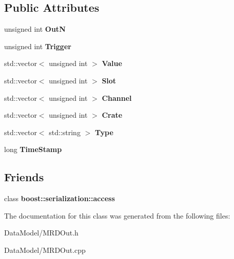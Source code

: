 \subsection*{Public Attributes}
\begin{DoxyCompactItemize}
\item 
\hypertarget{classMRDOut_a99fcd630b69a452e867b30bda86b9d6c}{unsigned int {\bfseries Out\-N}}\label{classMRDOut_a99fcd630b69a452e867b30bda86b9d6c}

\item 
\hypertarget{classMRDOut_aefae0cae9b9149247c66fec5140393af}{unsigned int {\bfseries Trigger}}\label{classMRDOut_aefae0cae9b9149247c66fec5140393af}

\item 
\hypertarget{classMRDOut_ae8b80ae7773fb9573a26cf791e18995d}{std\-::vector$<$ unsigned int $>$ {\bfseries Value}}\label{classMRDOut_ae8b80ae7773fb9573a26cf791e18995d}

\item 
\hypertarget{classMRDOut_a03e751accc75934f1ad7926415ce570e}{std\-::vector$<$ unsigned int $>$ {\bfseries Slot}}\label{classMRDOut_a03e751accc75934f1ad7926415ce570e}

\item 
\hypertarget{classMRDOut_a7849667340cd72441d429608ff9b98f9}{std\-::vector$<$ unsigned int $>$ {\bfseries Channel}}\label{classMRDOut_a7849667340cd72441d429608ff9b98f9}

\item 
\hypertarget{classMRDOut_a518db4f65639b83f1e1bcf42f31c1076}{std\-::vector$<$ unsigned int $>$ {\bfseries Crate}}\label{classMRDOut_a518db4f65639b83f1e1bcf42f31c1076}

\item 
\hypertarget{classMRDOut_aa943ba9150d67e2e1758b24324b4ae21}{std\-::vector$<$ std\-::string $>$ {\bfseries Type}}\label{classMRDOut_aa943ba9150d67e2e1758b24324b4ae21}

\item 
\hypertarget{classMRDOut_a1541d7fe5112f7932ec54b285c13eb08}{long {\bfseries Time\-Stamp}}\label{classMRDOut_a1541d7fe5112f7932ec54b285c13eb08}

\end{DoxyCompactItemize}
\subsection*{Friends}
\begin{DoxyCompactItemize}
\item 
\hypertarget{classMRDOut_ac98d07dd8f7b70e16ccb9a01abf56b9c}{class {\bfseries boost\-::serialization\-::access}}\label{classMRDOut_ac98d07dd8f7b70e16ccb9a01abf56b9c}

\end{DoxyCompactItemize}


The documentation for this class was generated from the following files\-:\begin{DoxyCompactItemize}
\item 
Data\-Model/M\-R\-D\-Out.\-h\item 
Data\-Model/M\-R\-D\-Out.\-cpp\end{DoxyCompactItemize}
